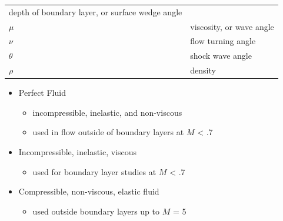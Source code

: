 \documentclass[
]{book}
\providecommand{\tightlist}{%
  \setlength{\itemsep}{0pt}\setlength{\parskip}{0pt}}
\begin{document}
\begin{longtable}[]{@{}ll@{}}
\begin{minipage}[t]{0.72\columnwidth}
depth of boundary layer, or surface wedge angle\strut
\end{minipage}\tabularnewline
\begin{minipage}[t]{0.22\columnwidth}\raggedright
\(\mu\)\strut
\end{minipage} & \begin{minipage}[t]{0.72\columnwidth}\raggedright
viscosity, or wave angle\strut
\end{minipage}\tabularnewline
\begin{minipage}[t]{0.22\columnwidth}\raggedright
\(\nu\)\strut
\end{minipage} & \begin{minipage}[t]{0.72\columnwidth}\raggedright
flow turning angle\strut
\end{minipage}\tabularnewline
\begin{minipage}[t]{0.22\columnwidth}\raggedright
\(\theta\)\strut
\end{minipage} & \begin{minipage}[t]{0.72\columnwidth}\raggedright
shock wave angle\strut
\end{minipage}\tabularnewline
\begin{minipage}[t]{0.22\columnwidth}\raggedright
\(\rho\)\strut
\end{minipage} & \begin{minipage}[t]{0.72\columnwidth}\raggedright
density\strut
\end{minipage}\tabularnewline
\bottomrule
\end{longtable}

\begin{itemize}
\tightlist
\item
  Perfect Fluid

  \begin{itemize}
  \tightlist
  \item
    incompressible, inelastic, and non-viscous
  \item
    used in flow outside of boundary layers at \(M\) \textless{} .7
  \end{itemize}
\item
  Incompressible, inelastic, viscous

  \begin{itemize}
  \tightlist
  \item
    used for boundary layer studies at \(M\) \textless{} .7
  \end{itemize}
\item
  Compressible, non-viscous, elastic fluid

  \begin{itemize}
  \tightlist
  \item
    used outside boundary layers up to \(M\) = 5
  \end{itemize}
\end{itemize}
\end{document}

